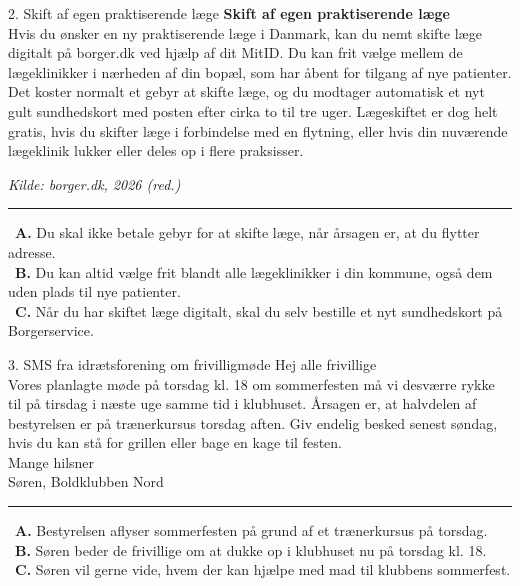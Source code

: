 \begin{emailbox}{2. Skift af egen praktiserende læge}
\textbf{Skift af egen praktiserende læge}\\
Hvis du ønsker en ny praktiserende læge i Danmark, kan du nemt skifte læge digitalt på borger.dk ved hjælp af dit MitID. Du kan frit vælge mellem de lægeklinikker i nærheden af din bopæl, som har åbent for tilgang af nye patienter. Det koster normalt et gebyr at skifte læge, og du modtager automatisk et nyt gult sundhedskort med posten efter cirka to til tre uger. Lægeskiftet er dog helt gratis, hvis du skifter læge i forbindelse med en flytning, eller hvis din nuværende lægeklinik lukker eller deles op i flere praksisser.
\par\vspace{0.15em}\strut\hfill {\small\textit{Kilde: borger.dk, 2026 (red.)}}

\vspace{0.3em}
\hrule
\vspace{0.3em}
\small
\fbox{\phantom{X}}\ \textbf{A.} Du skal ikke betale gebyr for at skifte læge, når årsagen er, at du flytter adresse.\\[0.25em]
\fbox{\phantom{X}}\ \textbf{B.} Du kan altid vælge frit blandt alle lægeklinikker i din kommune, også dem uden plads til nye patienter.\\[0.25em]
\fbox{\phantom{X}}\ \textbf{C.} Når du har skiftet læge digitalt, skal du selv bestille et nyt sundhedskort på Borgerservice.
\end{emailbox}

\begin{emailbox}{3. SMS fra idrætsforening om frivilligmøde}
Hej alle frivillige\\
Vores planlagte møde på torsdag kl. 18 om sommerfesten må vi desværre rykke til på tirsdag i næste uge samme tid i klubhuset. Årsagen er, at halvdelen af bestyrelsen er på trænerkursus torsdag aften. Giv endelig besked senest søndag, hvis du kan stå for grillen eller bage en kage til festen.\\
Mange hilsner\\
Søren, Boldklubben Nord

\vspace{0.3em}
\hrule
\vspace{0.3em}
\small
\fbox{\phantom{X}}\ \textbf{A.} Bestyrelsen aflyser sommerfesten på grund af et trænerkursus på torsdag.\\[0.25em]
\fbox{\phantom{X}}\ \textbf{B.} Søren beder de frivillige om at dukke op i klubhuset nu på torsdag kl. 18.\\[0.25em]
\fbox{\phantom{X}}\ \textbf{C.} Søren vil gerne vide, hvem der kan hjælpe med mad til klubbens sommerfest.
\end{emailbox}

